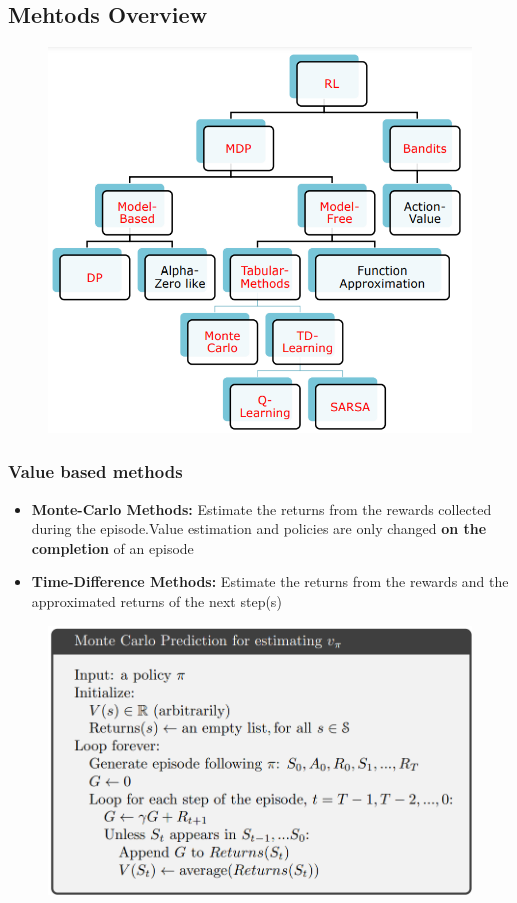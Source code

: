 \subsection{Mehtods Overview}
\begin{figure}[!h]
    \includegraphics[width = \columnwidth]{figures/DeepReinforcementLearning/RLOverview.png}
\end{figure}
\subsubsection{Value based methods}
\begin{itemize}
    \item \textbf{Monte-Carlo Methods:} Estimate the returns from the rewards collected during the episode.Value estimation and policies are only changed \textbf{on the completion} of an episode

    \item \textbf{Time-Difference Methods:} Estimate the returns from the rewards and the approximated
    returns of the next step(s)
\end{itemize}
\begin{figure}[!h]
    \includegraphics[width = \columnwidth]{figures/DeepReinforcementLearning/MonteCarlo.png}
\end{figure}


